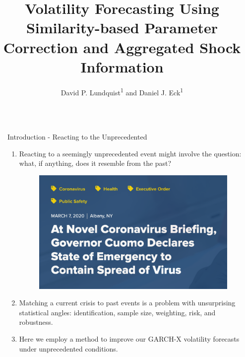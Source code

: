\documentclass{beamer} %
\title{\LARGE Volatility Forecasting Using Similarity-based Parameter Correction and Aggregated Shock Information} %
\author{David P. Lundquist\textsuperscript{1} and Daniel J. Eck\textsuperscript{1}} %
\institute{\textsuperscript{1}Department of Statistics, University of Illinois Urbana-Champaign} %
\begin{document}
\begin{frame}[t] %

\begin{columns}[t] %

\begin{column}{0.02\textwidth}\end{column} %

\begin{column}{0.465\textwidth} %


\begin{block}{Introduction - Reacting to the Unprecedented}
	\begin{enumerate}
		\item Reacting to a seemingly unprecedented event might involve the question: what, if anything, does it resemble from the past? 
		\begin{figure}
			\includegraphics[scale = .6]{../NYS_state.png}
		\end{figure} 
		\item Matching a current crisis to past events is a problem with unsurprising statistical angles: identification, sample size, weighting, risk, and robustness.
		\item Here we employ a method to improve our GARCH-X volatility forecasts under unprecedented conditions.
	\end{enumerate}



\end{block}
\end{column}
\end{columns}
\end{frame}
\end{document}
